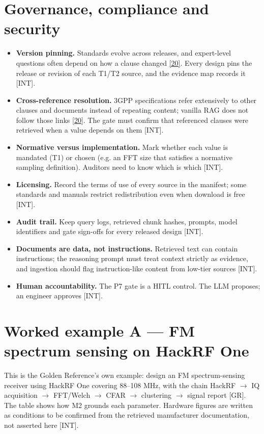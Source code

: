 \documentclass[11pt,a4paper]{article}
\newcommand{\prov}[1]{\textsf{\footnotesize[#1]}}
\begin{document}
\section{Governance, compliance and security}
\begin{itemize}
\item \textbf{Version pinning.} Standards evolve across releases, and expert-level questions often depend on how a clause changed \hyperlink{ref20}{[20]}. Every design pins the release or revision of each T1/T2 source, and the evidence map records it \prov{INT}.
\item \textbf{Cross-reference resolution.} 3GPP specifications refer extensively to other clauses and documents instead of repeating content; vanilla RAG does not follow those links \hyperlink{ref20}{[20]}. The gate must confirm that referenced clauses were retrieved when a value depends on them \prov{INT}.
\item \textbf{Normative versus implementation.} Mark whether each value is mandated (T1) or chosen (e.g. an FFT size that satisfies a normative sampling definition). Auditors need to know which is which \prov{INT}.
\item \textbf{Licensing.} Record the terms of use of every source in the manifest; some standards and manuals restrict redistribution even when download is free \prov{INT}.
\item \textbf{Audit trail.} Keep query logs, retrieved chunk hashes, prompts, model identifiers and gate sign-offs for every released design \prov{INT}.
\item \textbf{Documents are data, not instructions.} Retrieved text can contain instructions; the reasoning prompt must treat context strictly as evidence, and ingestion should flag instruction-like content from low-tier sources \prov{INT}.
\item \textbf{Human accountability.} The P7 gate is a HITL control. The LLM proposes; an engineer approves \prov{INT}.
\end{itemize}
\section{Worked example A --- FM spectrum sensing on HackRF One}
This is the Golden Reference's own example: design an FM spectrum-sensing receiver using HackRF One covering 88--108 MHz, with the chain HackRF \ensuremath{\rightarrow} IQ acquisition \ensuremath{\rightarrow} FFT/Welch \ensuremath{\rightarrow} CFAR \ensuremath{\rightarrow} clustering \ensuremath{\rightarrow} signal report \prov{GR}. The table shows how M2 grounds each parameter. Hardware figures are written as conditions to be confirmed from the retrieved manufacturer documentation, not asserted here \prov{INT}.
\end{document}
